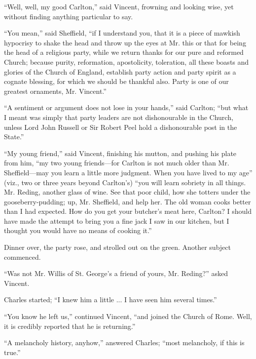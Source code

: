 ``Well, well, my good Carlton,'' said Vincent, frowning and
looking wise, yet without finding anything particular to say.

``You mean,'' said Sheffield, ``if I understand you,
that it is a piece of mawkish hypocrisy to shake the head and throw up
the eyes at Mr. this or that for being the head of a religious party,
while we return thanks for our pure and reformed Church; because
purity, reformation, apostolicity, toleration, all these boasts and
glories of the Church of England, establish party action and party
spirit as a cognate blessing, for which we should be thankful also.
Party is one of our greatest ornaments, Mr. Vincent.''

``A sentiment or argument does not lose in your hands,''
said Carlton; ``but what I meant was simply that party leaders are
not dishonourable in the Church, unless Lord John Russell or Sir
Robert Peel hold a dishonourable post in the State.''

``My young friend,'' said Vincent, finishing his mutton,
and pushing his plate from him, ``my two young friends—for
Carlton is not much older than Mr. Sheffield—may you learn a little
more judgment. When you have lived to my age'' (viz., two or three
years beyond Carlton's) ``you will learn sobriety in all things.
Mr. Reding, another glass of wine. See that poor child, how she
totters under the gooseberry-pudding; up, Mr. Sheffield, and help her.
The old woman cooks better than I had expected. How do you get your
butcher's meat here, Carlton? I should have made the attempt to bring
you a fine jack I saw in our kitchen, but I thought you would have no
means of cooking it.''

Dinner over, the party rose, and strolled out on the green. Another
subject commenced.

``Was not Mr. Willis of St. George's a friend of yours, Mr.
Reding?'' asked Vincent.

Charles started; ``I knew him a little ... I have seen him
several times.''

``You know he left us,'' continued Vincent, ``and
joined the Church of Rome. Well, it is credibly reported that he is
returning.''

``A melancholy history, anyhow,'' answered Charles;
``most melancholy, if this is true.''

